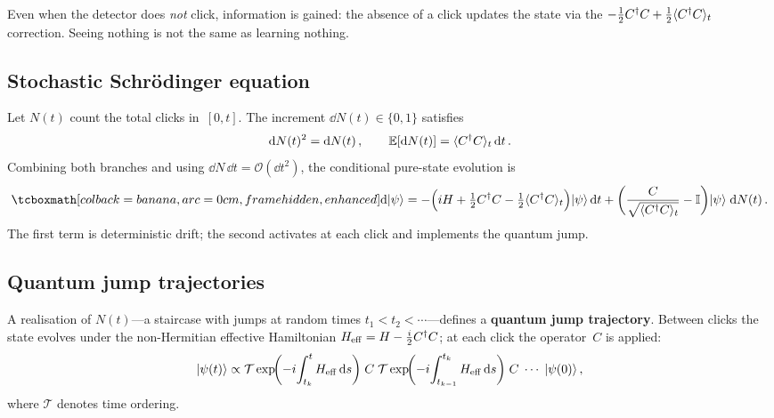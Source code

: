 \begin{intuition}
  Even when the detector does \emph{not} click, information is
  gained: the absence of a click updates the state via the
  $-\tfrac{1}{2}C^\dagger C + \tfrac{1}{2}\langle C^\dagger C \rangle_t$
  correction.  Seeing nothing is not the same as learning nothing.
\end{intuition}

\subsection{Stochastic Schr\"odinger equation}%
\label{sec:stochastic-schroedinger}

Let $N(t)$ count the total clicks in~$[0,t]$.  The increment
$\dd N(t) \in \{0,1\}$ satisfies
\begin{equation}\label{eq:dN-properties}
  \mathrm{d} N(t)^2 = \mathrm{d} N(t)\,,\qquad
  \mathbb{E}[\mathrm{d} N(t)]
  = \langle C^\dagger C \rangle_t\,\mathrm{d} t\,.
\end{equation}
Combining both branches and using
$\dd N\,\dd t = \mathcal{O}(\dd t^2)$, the conditional pure-state
evolution is
\begin{equation}\label{eq:sse}
  \eqbox{\dd\ket{\psi}
  = -\Bigl(iH
    + \tfrac{1}{2}C^\adj C
    - \tfrac{1}{2}\expect{C^\adj C}_t\Bigr)
    \ket{\psi}\,\dd t
  + \biggl(\frac{C}{\sqrt{\expect{C^\adj C}_t}}
    - \One\biggr)\ket{\psi}\;\dd N(t)}\,.
\end{equation}
The first term is deterministic drift; the second activates at each
click and implements the quantum jump.

\subsection{Quantum jump trajectories}\label{sec:trajectories}

A realisation of $N(t)$---a staircase with jumps at random times
$t_1 < t_2 < \cdots$---defines a \textbf{quantum jump trajectory}.
Between clicks the state evolves under the non-Hermitian effective
Hamiltonian $H_{\mathrm{eff}} = H - \tfrac{i}{2}C^\dagger C$; at each
click the operator~$C$ is applied:
\begin{equation}\label{eq:trajectory}
  \lvert \psi(t) \rangle
  \propto \mathcal{T}\exp\!\biggl(
      -i\!\int_{t_{k}}^{t} H_{\mathrm{eff}}\,\mathrm{d} s
    \biggr)\;
    C\;\mathcal{T}\exp\!\biggl(
      -i\!\int_{t_{k-1}}^{t_k} H_{\mathrm{eff}}\,\mathrm{d} s
    \biggr)\;C\;\cdots\;\lvert \psi(0) \rangle\,,
\end{equation}
where $\mathcal{T}$ denotes time ordering.

